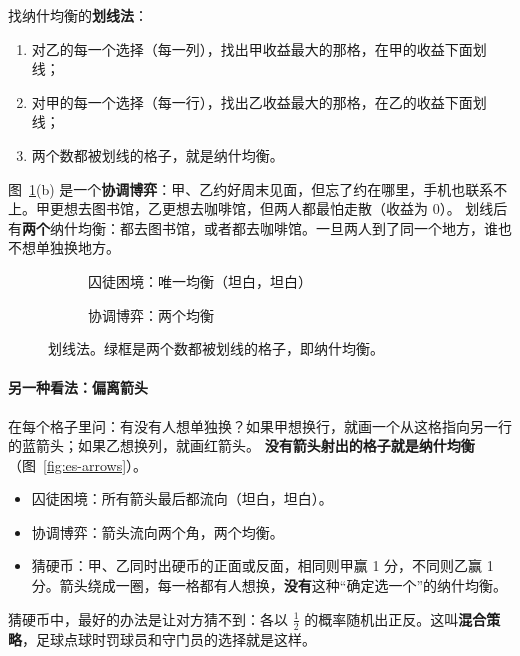 找纳什均衡的\textbf{划线法}：
\begin{enumerate}
  \item 对乙的每一个选择（每一列），找出甲收益最大的那格，在\textcolor{mjAccent}{甲的收益}下面划线；
  \item 对甲的每一个选择（每一行），找出乙收益最大的那格，在\textcolor{mjSecond}{乙的收益}下面划线；
  \item 两个数都被划线的格子，就是纳什均衡。
\end{enumerate}

图~\ref{fig:es-underline}(b) 是一个\textbf{协调博弈}：甲、乙约好周末见面，但忘了约在哪里，手机也联系不上。甲更想去图书馆，乙更想去咖啡馆，但两人都最怕走散（收益为 0）。
划线后有\textbf{两个}纳什均衡：都去图书馆，或者都去咖啡馆。一旦两人到了同一个地方，谁也不想单独换地方。

\begin{figure}[!htbp]
\centering
\begin{subfigure}{.48\textwidth}\centering
{}
\caption{囚徒困境：唯一均衡（坦白，坦白）}
\end{subfigure}\hfill
\begin{subfigure}{.48\textwidth}\centering
{}
\caption{协调博弈：两个均衡}
\end{subfigure}
\caption{划线法。绿框是两个数都被划线的格子，即纳什均衡。}
\label{fig:es-underline}
\end{figure}

\paragraph{另一种看法：偏离箭头}
在每个格子里问：有没有人想单独换？如果甲想换行，就画一个从这格指向另一行的\textcolor{mjAccent}{蓝箭头}；如果乙想换列，就画\textcolor{mjSecond}{红箭头}。
\textbf{没有箭头射出的格子就是纳什均衡}（图~\ref{fig:es-arrows}）。
\begin{itemize}
  \item 囚徒困境：所有箭头最后都流向（坦白，坦白）。
  \item 协调博弈：箭头流向两个角，两个均衡。
  \item 猜硬币：甲、乙同时出硬币的正面或反面，相同则甲赢 1 分，不同则乙赢 1 分。箭头绕成一圈，每一格都有人想换，\textbf{没有}这种“确定选一个”的纳什均衡。
\end{itemize}
猜硬币中，最好的办法是让对方猜不到：各以 $\frac12$ 的概率随机出正反。这叫\textbf{混合策略}，足球点球时罚球员和守门员的选择就是这样。

